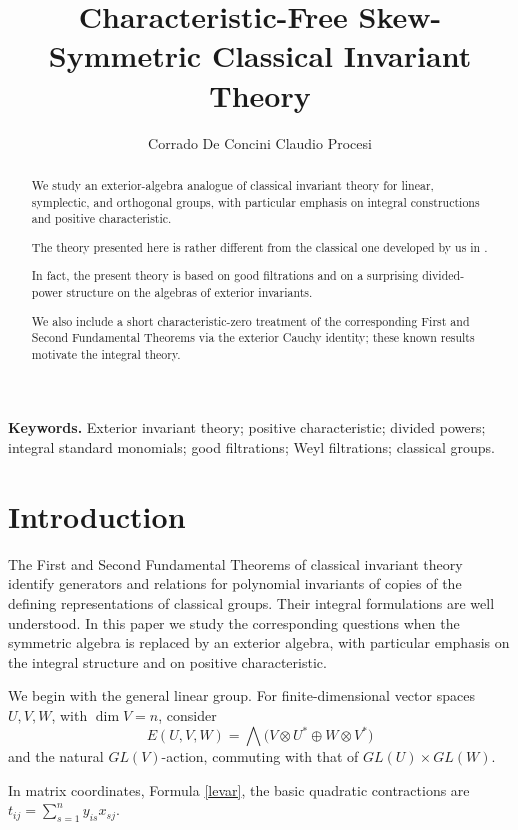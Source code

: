 \documentclass[10pt]{amsart}
\title{Characteristic-Free Skew-Symmetric Classical Invariant Theory}
\author{Corrado De Concini 
Claudio Procesi}
\date{}
\theoremstyle{definition}
\theoremstyle{remark}
\begin{document}
\maketitle
 
\begin{abstract}
We study an exterior-algebra analogue of classical invariant theory for
linear, symplectic, and orthogonal groups, with particular emphasis on
integral constructions and positive characteristic.  

The theory presented here is rather different  from the classical one developed by us  in \cite{DeConciniProcesi1976}.

In fact, the present theory is based on good filtrations and on a surprising divided-power structure on   the algebras of exterior invariants.\medskip


 We also include a short characteristic-zero treatment of
the corresponding First and Second Fundamental Theorems via the exterior
Cauchy identity; these known results motivate the integral theory.
\end{abstract}

\medskip
\noindent\textbf{Keywords.} Exterior invariant theory; positive characteristic;
divided powers; integral standard monomials; good filtrations; Weyl
filtrations; classical groups.

\tableofcontents


\section*{Introduction}

The First and Second Fundamental Theorems of classical invariant theory
identify generators and relations for polynomial invariants of copies of the  defining representations of  classical
groups. Their integral formulations are well understood. In this paper we
study the corresponding questions when the symmetric algebra is replaced by
an exterior algebra, with particular emphasis on the integral structure and
on positive characteristic.\smallskip

We begin with the general linear group. For finite-dimensional vector spaces
$U,V,W$, with $\dim V=n$, consider
\[
 E(U,V,W)=\bigwedge\bigl(V\otimes U^*\oplus W\otimes V^*\bigr)
\]
and the natural $GL(V)$-action, commuting with that of
$GL(U)\times GL(W)$.\smallskip

 In matrix coordinates, Formula  \eqref{levar}, the basic quadratic contractions
are $t_{ij}=\sum_{s=1}^n y_{is}x_{sj}$. 
\end{document}
